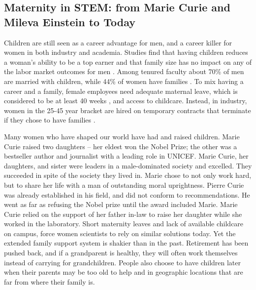 \documentclass[utf8]{frontiersSCNS} %
\begin{document}
\subsection{Maternity in STEM: from Marie Curie and Mileva Einstein to Today}
\label{Sec9}
Children are still seen as a career advantage for men, and a career killer for women in both industry and academia. Studies find that having children reduces a woman's ability to be a top earner and that family size has no impact on any of the labor market outcomes for men \citep{Cools2017}. Among tenured faculty about 70\% of men are married with children, while 44\% of women have families \citep{mason2004marriage}. To mix having a career and a family, female employees need adequate maternal leave, which is considered to be at least 40 weeks \citep{ruhm2000parental}, and access to childcare. Instead, in industry, women in the 25-45 year bracket are hired on temporary contracts that terminate if they chose to have families \citep{Cools2017}.   


Many women who have shaped our world have had and raised children.  Marie Curie raised two daughters -- her eldest won the Nobel Prize; the other was a bestseller author and journalist with a leading role in UNICEF. Marie Curie, her daughters, and sister were leaders in a male-dominated society and excelled. They succeeded in spite of the society they lived in. Marie chose to not only work hard, but to share her life with a man of outstanding moral uprightness. Pierre Curie was already established in his field, and did not conform to recommendations. He went as far as refusing the Nobel prize until the award included Marie. Marie Curie relied on the support of her father in-law to raise her daughter while she worked in the laboratory. Short maternity leaves and lack of available childcare on campus, force women scientists to rely on similar solutions today. Yet the extended family support system is shakier than in the past. Retirement has been pushed back, and if a grandparent is healthy, they will often work themselves instead of carrying for grandchildren. People also choose to have children later when their parents may be too old to help and in geographic locations that are far from where their family is. 
\end{document}

